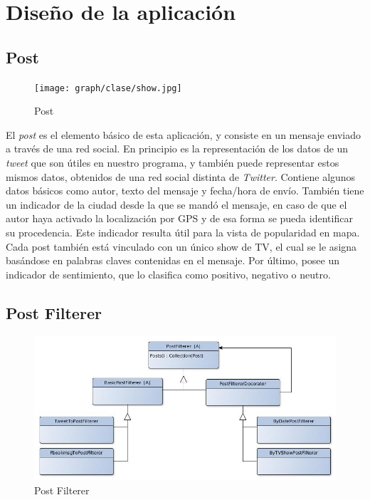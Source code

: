  

\section{Diseño de la aplicación}


\subsection{Post}

\begin{figure}[H]
\centering
\texttt{[image: graph/clase/show.jpg]}
\caption{Post}
\end{figure}

El \emph{post} es el elemento básico de esta aplicación, y consiste en un mensaje enviado a través de una red social. En principio es la representación de los datos de un \emph{tweet} que son útiles en nuestro programa, y también puede representar estos mismos datos, obtenidos de una red social distinta de \emph{Twitter}. Contiene algunos datos básicos como autor, texto del mensaje y fecha/hora de envío. También tiene un indicador de la ciudad desde la que se mandó el mensaje, en caso de que el autor haya activado la localización por GPS y de esa forma se pueda identificar su procedencia. Este indicador resulta útil para la vista de popularidad en mapa. Cada post también está vinculado con un único show de TV, el cual se le asigna basándose en palabras claves contenidas en el mensaje. Por último, posee un indicador de sentimiento, que lo clasifica como positivo, negativo o neutro.

\subsection{Post Filterer}

\begin{figure}[H]
\centering
\includegraphics[width=\textwidth]{graph/clase/filterer.jpg}
\caption{Post Filterer}
\end{figure}

